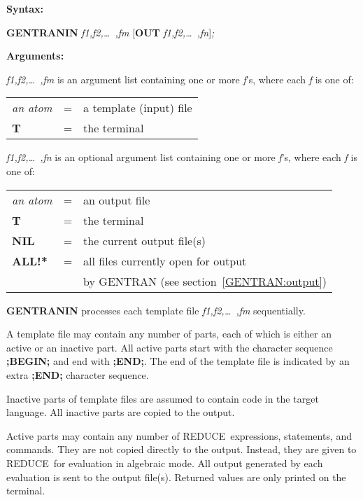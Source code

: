 \documentclass[11pt,letterpaper]{book}
\newcommand{\REDUCE}{REDUCE}
\newenvironment{describe}[1]{\par{\bf #1}\begin{indented}}{\end{indented}}
\begin{document}
\label{templates}
\begin{describe}{Syntax:}
{\bf GENTRANIN} {\it f1,f2,\dots\ ,fm} [{\bf OUT} {\it f1,f2,\dots\
 ,fn\/}]{\it ;}
\end{describe}
\begin{describe}{Arguments:}
{\it f1,f2,\dots\ ,fm\/} is an argument list containing one or more
{\it f\/}'s,
where each {\it f\/} is one of:
\begin{center}
\begin{tabular}{lll}
{\it an atom}& = &a template (input) file\\
{\bf T}& = &the terminal\\
\end{tabular}
\end{center}
{\it f1,f2,\dots\ ,fn\/} is an optional argument list containing one or more
{\it f\/}'s, where each {\it f\/} is one of:
\begin{center}
\begin{tabular}{lll}
{\it an atom}& = &an output file\\
{\bf T}& = &the terminal\\
{\bf NIL}& = &the current output file(s)\\
{\bf ALL!*}& = &all files currently open for output \\
& &  by GENTRAN (see section~\ref{GENTRAN:output}) \\
\end{tabular}
\end{center}
\end{describe}
{\bf GENTRANIN} processes each template file {\it f1,f2,\dots\ ,fm}
sequentially.

A template file may contain any number of parts, each of which
is either an active or an inactive part.  All active parts start with
the character sequence {\bf ;BEGIN;} and end with {\bf ;END;}.  The end
of the template file is indicated by an extra {\bf ;END;} character
sequence.\index{;BEGIN; marker} \index{;END; marker}

Inactive parts of template files are assumed to contain code in the
target language.  All inactive parts are
copied to the output.

Active parts may contain any number of \REDUCE\ expressions, statements,
and commands.  They are not copied directly to the output.  Instead,
they are given to \REDUCE\ for evaluation in algebraic mode.  All output
generated by each evaluation is sent to the output file(s).  Returned
values are only printed on the terminal.
\end{document}
